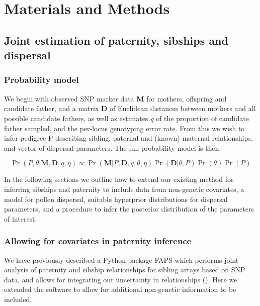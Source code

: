 \documentclass[10pt, a4paper, twocolumn]{article} %
\begin{document}

\section{Materials and Methods}

\subsection{Joint estimation of paternity, sibships and dispersal}

\subsubsection{Probability model}

We begin with observed SNP marker data \textbf{M} for mothers, offspring and candidate father, and a matrix \textbf{D} of Euclidean distances between mothers and all possible candidate fathers, as well as estimates \textit{q} of the proportion of candidate father sampled, and the per-locus genotyping error rate. From this we wish to infer pedigree P describing sibling, paternal and (known) maternal relationships, and vector  of dispersal parameters. The full probability model is then

\begin{equation}
\label{eqn:probability_model}
\Pr( P, \theta | \textbf{M}, \textbf{D}, q, \eta)
\propto
\Pr(\textbf{M} | P, \textbf{D}, q,\theta, \eta)
\Pr(\textbf{D} | \theta, P)
\Pr(\theta) \Pr(P)
\end{equation}

In the following sections we outline how to extend our existing method for inferring sibships and paternity to include data from non-genetic covariates, a model for pollen dispersal, suitable hyperprior distributions for dispersal parameters, and a procedure to infer the posterior distribution of the parameters of interest.

\subsubsection{Allowing for covariates in paternity inference}

We have previously described a Python package FAPS which performs joint analysis of paternity and sibship relationships for sibling arrays based on SNP data, and allows for integrating out uncertainty in relationships (\cite{ellis2016repeated}). Here we extended the software to allow for additional non-genetic information to be included.
\end{document}

